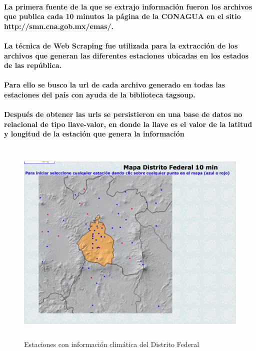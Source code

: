     \paragraph{La primera fuente de la que se extrajo información fueron los archivos que publica cada 10 minutos la página de la CONAGUA en el sitio \textbf{http://smn.cna.gob.mx/emas/}.}
    \paragraph{La técnica de Web Scraping fue utilizada para la extracción de los archivos que generan las diferentes estaciones ubicadas en los estados de las república.}
    \paragraph{Para ello se busco la url de cada archivo generado en todas las estaciones del país con ayuda de la biblioteca \textbf{tagsoup}.}
    \paragraph{Después de obtener las urls se persistieron en una base de datos no relacional de tipo llave-valor, en donde la llave es el valor de la latitud y longitud de la estación que genera la información}
    \begin{figure}[b!]
    \begin{center}
      \includegraphics[width=14cm,height=10cm]{./images/DF_Stations}
      \caption{Estaciones con información climática del Distrito Federal}
    \end{center}
    \end{figure}
